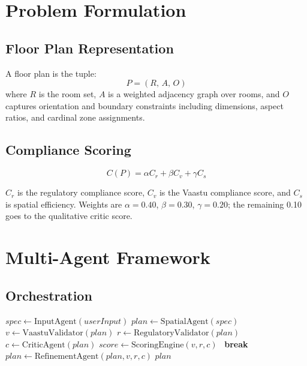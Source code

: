 \documentclass[journal]{IEEEtran}
\begin{document}
\section{Problem Formulation}

\subsection{Floor Plan Representation}

A floor plan is the tuple:
\begin{equation}
P = (R,\, A,\, O)
\end{equation}
where $R$ is the room set, $A$ is a weighted adjacency graph over rooms, and
$O$ captures orientation and boundary constraints including dimensions, aspect
ratios, and cardinal zone assignments.

\subsection{Compliance Scoring}

\begin{equation}
C(P) = \alpha C_r + \beta C_v + \gamma C_s
\end{equation}

$C_r$ is the regulatory compliance score, $C_v$ is the Vaastu compliance
score, and $C_s$ is spatial efficiency. Weights are $\alpha = 0.40$,
$\beta = 0.30$, $\gamma = 0.20$; the remaining 0.10 goes to the qualitative
critic score.

\section{Multi-Agent Framework}

\subsection{Orchestration}

\begin{algorithm}[t]
\caption{Iterative Plan Optimization}
\begin{algorithmic}[1]
\State $spec \gets \text{InputAgent}(userInput)$
\State $plan \gets \text{SpatialAgent}(spec)$
    \State $v \gets \text{VaastuValidator}(plan)$
    \State $r \gets \text{RegulatoryValidator}(plan)$
    \State $c \gets \text{CriticAgent}(plan)$
    \State $score \gets \text{ScoringEngine}(v,r,c)$
    \ \textbf{break}
    \EndIf
    \State $plan \gets \text{RefinementAgent}(plan,v,r,c)$
\EndFor
\State \Return $plan$
\end{algorithmic}
\end{algorithm}
\end{document}
